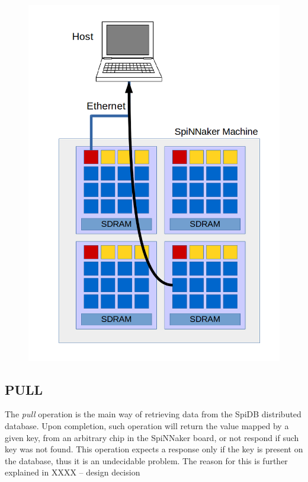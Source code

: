 \begin{figure}
\begin{minipage}{.32\textwidth}
  \includegraphics[width=1\linewidth, natwidth=794, natheight=1123]{images/put3.png}
  \label{fig:leaf-host}
\end{minipage}
\end{figure}


\subsection{PULL}
The \textit{pull} operation is the main way of retrieving data from the SpiDB distributed database. 
Upon completion, such operation will return the value mapped by a given key, from an arbitrary chip in the SpiNNaker board, or not respond if such key was not found. This operation expects a response only if the key is present on the database, thus it is an undecidable problem. The reason for this is further explained in XXXX -- design decision

